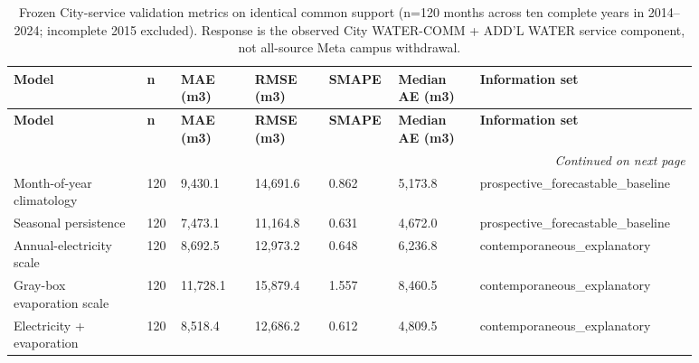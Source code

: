 \begingroup
\footnotesize
\setlength{\tabcolsep}{3pt}
\setlength{\emergencystretch}{3em}
\raggedright
\sloppy
\begin{longtable}{@{}p{0.180\linewidth}p{0.040\linewidth}p{0.100\linewidth}p{0.100\linewidth}p{0.080\linewidth}p{0.110\linewidth}p{0.270\linewidth}@{}}
\caption{Frozen City-service validation metrics on identical common support (n=120 months across ten complete years in 2014--2024; incomplete 2015 excluded). Response is the observed City WATER-COMM + ADD'L WATER service component, not all-source Meta campus withdrawal.}\\
\toprule
\textbf{Model} & \textbf{n} & \textbf{MAE (m3)} & \textbf{RMSE (m3)} & \textbf{SMAPE} & \textbf{Median AE (m3)} & \textbf{Information set} \\
\midrule
\endfirsthead
\toprule
\textbf{Model} & \textbf{n} & \textbf{MAE (m3)} & \textbf{RMSE (m3)} & \textbf{SMAPE} & \textbf{Median AE (m3)} & \textbf{Information set} \\
\midrule
\endhead
\midrule
\multicolumn{7}{r}{\emph{Continued on next page}}\\
\endfoot
\bottomrule
\endlastfoot
Month-of-year climatology & 120 & 9,430.1 & 14,691.6 & 0.862 & 5,173.8 & prospective\_forecastable\_baseline \\
Seasonal persistence & 120 & 7,473.1 & 11,164.8 & 0.631 & 4,672.0 & prospective\_forecastable\_baseline \\
Annual-electricity scale & 120 & 8,692.5 & 12,973.2 & 0.648 & 6,236.8 & contemporaneous\_explanatory \\
Gray-box evaporation scale & 120 & 11,728.1 & 15,879.4 & 1.557 & 8,460.5 & contemporaneous\_explanatory \\
Electricity + evaporation & 120 & 8,518.4 & 12,686.2 & 0.612 & 4,809.5 & contemporaneous\_explanatory \\
\end{longtable}
\endgroup
